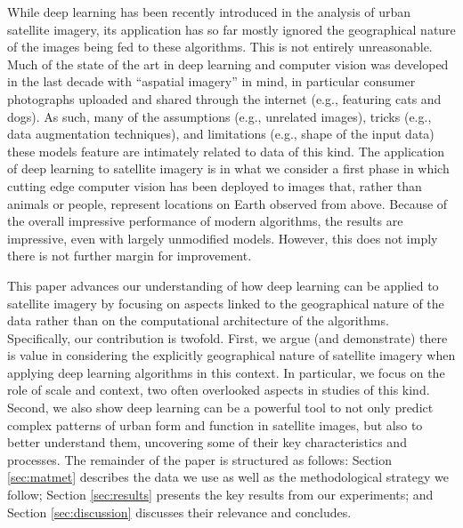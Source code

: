 \documentclass[]{interact}
\theoremstyle{plain}%
\theoremstyle{definition}
\theoremstyle{remark}
\begin{document}

While deep learning has been recently introduced in the analysis of urban satellite
imagery, its application has so far mostly ignored the geographical nature of
the images being fed to these algorithms. This is not entirely unreasonable.
Much of the state of the art in deep learning and computer vision was
developed in the last decade with ``aspatial imagery'' in mind, in particular consumer
photographs uploaded and shared through the internet (e.g., featuring cats and
dogs). As such, many of the assumptions (e.g., unrelated images), tricks
(e.g., data augmentation techniques), and limitations (e.g., shape of the
input data) these models
feature are intimately related to data of this kind. The application of deep
learning to satellite imagery is in what we consider a first phase in which
cutting edge computer vision has been deployed to images that, rather than
animals or people, represent locations on Earth observed from above. Because
of the overall impressive performance of modern algorithms, the results are
impressive, even with largely unmodified models. However, this does not imply
there is not further margin for improvement.

This paper advances our understanding of how deep learning can be applied to
satellite imagery by focusing on aspects linked to the geographical nature of the
data rather than on the computational architecture of the algorithms.
Specifically, our contribution is twofold. First, we argue (and demonstrate)
there is value in considering the explicitly geographical nature of satellite
imagery when applying deep learning algorithms in this context.
In particular, we focus on the role of scale and context, two often overlooked
aspects in studies of this kind.
%
Second, we also show deep learning can be a powerful tool to not only predict
complex patterns of urban form and function in satellite images, but also to
better understand them, uncovering some of their key characteristics and
processes.
%
The remainder of the paper is structured as follows:
Section \ref{sec:matmet} describes the data we use as well as the
methodological strategy we follow;
Section \ref{sec:results} presents the key results from our experiments;
and Section \ref{sec:discussion} discusses their relevance and concludes.

\end{document}

